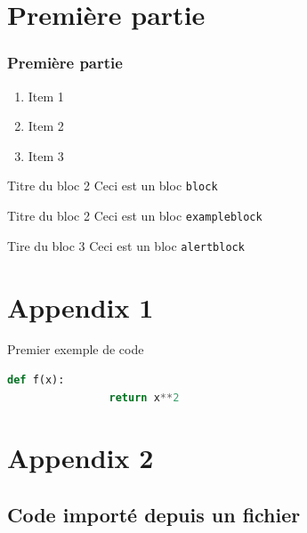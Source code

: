 \documentclass{beamer}
\begin{document}
    \section{Première partie}
    \begin{frame}
        \frametitle{Première partie}
        \begin{enumerate}
            \item Item 1
            \item Item 2
            \item Item 3
        \end{enumerate}
        \begin{block}{Titre du bloc 2} Ceci est un bloc \texttt{block} \end{block}
        \begin{exampleblock}{Titre du bloc 2} Ceci est un bloc \texttt{exampleblock} \end{exampleblock}
        \begin{alertblock}{Tire du bloc 3} Ceci est un bloc \texttt{alertblock} \end{alertblock}
    \end{frame}

    \appendix
    \begin{frame}
        \frametitle{\appendixname}
        \tableofcontents[currentsection]
    \end{frame}
    \section{Appendix 1}
    \begin{frame}[allowframebreaks=1,fragile,t]
        Premier exemple de code
        \begin{lstlisting}[language=Python]
            def f(x):
                return x**2
        \end{lstlisting}
    \end{frame}
    \section{Appendix 2}
    \subsection{Code importé depuis un fichier}
    \begin{frame}[allowframebreaks=1,fragile,t]
        
    \end{frame}
\end{document}
